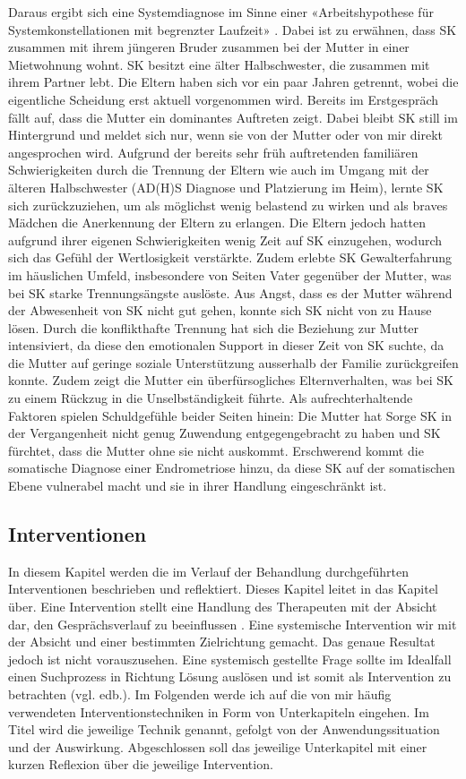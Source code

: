 Daraus ergibt sich eine Systemdiagnose im Sinne einer «Arbeitshypothese für Systemkonstellationen mit begrenzter Laufzeit» \cite{Spitzcok1999}. Dabei ist zu erwähnen, dass SK zusammen mit ihrem jüngeren Bruder zusammen bei der Mutter in einer Mietwohnung wohnt. SK besitzt eine älter Halbschwester, die zusammen mit ihrem Partner lebt. Die Eltern haben sich vor ein paar Jahren getrennt, wobei die eigentliche Scheidung erst aktuell vorgenommen wird. Bereits im Erstgespräch fällt auf, dass die Mutter ein dominantes Auftreten zeigt. Dabei bleibt SK still im Hintergrund und meldet sich nur, wenn sie von der Mutter oder von mir direkt angesprochen wird. Aufgrund der bereits sehr früh auftretenden familiären Schwierigkeiten durch die Trennung der Eltern wie auch im Umgang mit der älteren Halbschwester (AD(H)S Diagnose und Platzierung im Heim), lernte SK sich zurückzuziehen, um als möglichst wenig belastend zu wirken und als braves Mädchen die Anerkennung der Eltern zu erlangen. Die Eltern jedoch hatten aufgrund ihrer eigenen Schwierigkeiten wenig Zeit auf SK einzugehen, wodurch sich das Gefühl der Wertlosigkeit verstärkte. Zudem erlebte SK Gewalterfahrung im häuslichen Umfeld, insbesondere von Seiten Vater gegenüber der Mutter, was bei SK starke Trennungsängste auslöste. Aus Angst, dass es der Mutter während der Abwesenheit von SK nicht gut gehen, konnte sich SK nicht von zu Hause lösen. Durch die konflikthafte Trennung hat sich die Beziehung zur Mutter intensiviert, da diese den emotionalen Support in dieser Zeit von SK suchte, da die Mutter auf geringe soziale Unterstützung ausserhalb der Familie zurückgreifen konnte. Zudem zeigt die Mutter ein überfürsogliches Elternverhalten, was bei SK zu einem Rückzug in die Unselbständigkeit führte. Als aufrechterhaltende Faktoren spielen Schuldgefühle beider Seiten hinein: Die Mutter hat Sorge SK in der Vergangenheit nicht genug Zuwendung entgegengebracht zu haben und SK fürchtet, dass die Mutter ohne sie nicht auskommt. Erschwerend kommt die somatische Diagnose einer Endrometriose hinzu, da diese SK auf der somatischen Ebene vulnerabel macht und sie in ihrer Handlung eingeschränkt ist. 

\subsection{Interventionen} 
In diesem Kapitel werden die im Verlauf der Behandlung durchgeführten Interventionen beschrieben und reflektiert. Dieses Kapitel leitet in das Kapitel  über. Eine Intervention stellt eine Handlung des Therapeuten mit der Absicht dar, den Gesprächsverlauf zu beeinflussen \cite{Starke2019}. Eine systemische Intervention wir mit der Absicht und einer bestimmten Zielrichtung gemacht. Das genaue Resultat jedoch ist nicht vorauszusehen. Eine systemisch gestellte Frage sollte im Idealfall einen Suchprozess in Richtung Lösung auslösen und ist somit als Intervention zu betrachten (vgl. edb.). Im Folgenden werde ich auf die von mir häufig verwendeten Interventionstechniken in Form von Unterkapiteln eingehen. Im Titel wird die jeweilige Technik genannt, gefolgt von der Anwendungssituation und der Auswirkung. Abgeschlossen soll das jeweilige Unterkapitel mit einer kurzen Reflexion über die jeweilige Intervention.

